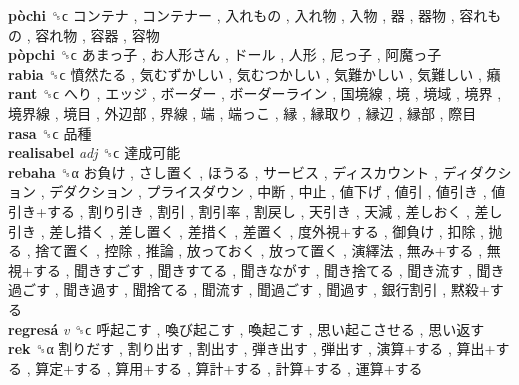 \textbf{pòchi} ␝ϲ   コンテナ ,  コンテナー ,  入れもの ,  入れ物 ,  入物 ,  器 ,  器物 ,  容れもの ,  容れ物 ,  容器 ,  容物   \\
\textbf{pòpchi} ␝ϲ   あまっ子 ,  お人形さん ,  ドール ,  人形 ,  尼っ子 ,  阿魔っ子   \\
\textbf{rabia} ␝ϲ   憤然たる ,  気むずかしい ,  気むつかしい ,  気難かしい ,  気難しい ,  癪   \\
\textbf{rant} ␝ϲ   へり ,  エッジ ,  ボーダー ,  ボーダーライン ,  国境線 ,  境 ,  境域 ,  境界 ,  境界線 ,  境目 ,  外辺部 ,  界線 ,  端 ,  端っこ ,  縁 ,  縁取り ,  縁辺 ,  縁部 ,  際目   \\
\textbf{rasa} ␝ϲ   品種   \\
\textbf{realisabel} \emph{adj}  ␝ϲ   達成可能   \\
\textbf{rebaha} ␝α   お負け ,  さし置く ,  ほうる ,  サービス ,  ディスカウント ,  ディダクション ,  デダクション ,  プライスダウン ,  中断 ,  中止 ,  値下げ ,  値引 ,  値引き ,  値引き+する ,  割り引き ,  割引 ,  割引率 ,  割戻し ,  天引き ,  天減 ,  差しおく ,  差し引き ,  差し措く ,  差し置く ,  差措く ,  差置く ,  度外視+する ,  御負け ,  扣除 ,  抛る ,  捨て置く ,  控除 ,  推論 ,  放っておく ,  放って置く ,  演繹法 ,  無み+する ,  無視+する ,  聞きすごす ,  聞きすてる ,  聞きながす ,  聞き捨てる ,  聞き流す ,  聞き過ごす ,  聞き過す ,  聞捨てる ,  聞流す ,  聞過ごす ,  聞過す ,  銀行割引 ,  黙殺+する   \\
\textbf{regresá} \emph{v}  ␝ϲ   呼起こす ,  喚び起こす ,  喚起こす ,  思い起こさせる ,  思い返す   \\
\textbf{rek} ␝α   割りだす ,  割り出す ,  割出す ,  弾き出す ,  弾出す ,  演算+する ,  算出+する ,  算定+する ,  算用+する ,  算計+する ,  計算+する ,  運算+する   \\
